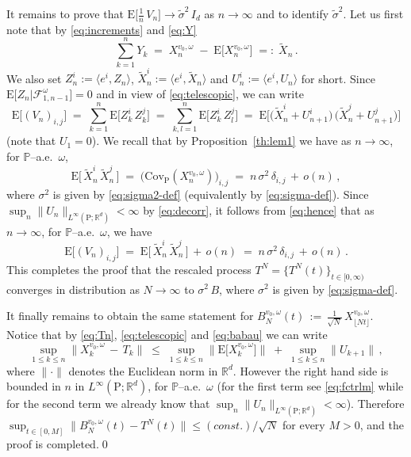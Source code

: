\documentclass[a4paper,reqno,11pt]{amsart}
\numberwithin{equation}{section}
\newcommand{\bbP}{{\ensuremath{\mathbb P}} }
\newcommand{\cF}{{\ensuremath{\mathcal F}} }
\newcommand{\gd}{\delta}
\newcommand{\gs}{\sigma}
\newcommand{\go}{\omega}
\renewcommand{\tilde}{\widetilde}          %
\newcommand{\R}{\mathbb{R}}
\def\bP{\ensuremath{\bs{\mathrm{P}}}}
\def\bE{\ensuremath{\bs{\mathrm{E}}}}
\def\bs{\boldsymbol}
\begin{document}
It remains to prove that $\bE \big[ \frac 1n \, V_n \big] \to \tilde\gs^2 \, I_d$
as $n\to\infty$ and to identify $\tilde\gs^2$.
Let us first note that by \eqref{eq:increments} and \eqref{eq:Y}
\begin{equation} \label{eq:babau}
	\sum_{k=1}^n Y_k \;=\; X_n^{v_0, \go} \;-\; \bE \big[ X_n^{v_0, \go} \big]
	\;=:\; \widetilde X_n
	\,.
\end{equation}
We also set $Z_n^i := \langle e^i, Z_n \rangle$,
$\widetilde X_n^i := \langle e^i, \widetilde X_n \rangle$
and $U_n^i := \langle e^i, U_n \rangle$ for short.
Since $\bE \big[ Z_n \big| \cF^\go_{1,n-1} \big] = 0$
and in view of \eqref{eq:telescopic}, we can write
\begin{equation} \label{eq:hence}
	\bE \big[ (V_n)_{i,j} \big] \;=\; \sum_{k=1}^n
	\bE \big[ Z_k^i \, Z_k^j \big] \;=\; \sum_{k,l=1}^n
	\bE \big[ Z_k^i \, Z_l^j \big] \;=\;
	\bE \big[ \big(\tilde X_n^i + U_{n+1}^i\big)\, \big(\tilde X_n^j + U_{n+1}^j \big) \big]
\end{equation}
(note that $U_1 = 0$). We recall that by Proposition~\ref{th:lem1} we have as $n \to \infty$,
for $\bbP$--a.e.~$\go$,
\begin{equation}
	\bE \big[\, \tilde X_n^i \, \tilde X_n^j \, \big] \;=\;
	\big( \text{Cov}_{\bP}( X_n^{v_0, \go}) \big)_{i,j} \;=\; n \, \gs^2 \, \gd_{i,j}
	\,+\, o(n) \,,
\end{equation}
where $\gs^2$ is given by \eqref{eq:sigma2-def} (equivalently by \eqref{eq:sigma-def}).
Since $\sup_n \|U_n\|_{L^\infty(\bP;\R^d)}<\infty$ by \eqref{eq:decorr},
it follows from \eqref{eq:hence} that as $n \to \infty$, for $\bbP$--a.e.~$\go$, we have
\begin{equation}
	\bE \big[ (V_n)_{i,j} \big] \;=\; \bE \big[\, \tilde X_n^i \, \tilde X_n^j \, \big]
	\,+\, o(n) \;=\; n \, \gs^2 \, \gd_{i,j} \,+\, o(n) \,.
\end{equation}
This completes the proof that the rescaled process $T^N = \{T^N(t)\}_{t \in [0,\infty)}$
converges in distribution as $N \to \infty$ to $\gs^2 \, B$, where
$\gs^2$ is given by \eqref{eq:sigma-def}.

It finally remains to obtain the same statement for
$B^{v_0, \go}_{N}(t) \,:=\, \frac{1}{\sqrt N} \, X^{v_0, \omega}_{ \lfloor Nt\rfloor}$.
Notice that by \eqref{eq:Tn}, \eqref{eq:telescopic} and \eqref{eq:babau} we can write
\begin{equation}
	\sup_{1 \le k \le n} \big\| X^{v_0, \omega}_k \,-\, T_k \big\| \;\le\;
	\sup_{1 \le k \le n} \big\| \bE \big[ X^{v_0, \omega}_k \big] \big\| \;+\;
	\sup_{1 \le k \le n} \big\| U_{k+1} \big\| \,,
\end{equation}
where $\|\cdot\|$ denotes the Euclidean norm in $\R^d$.
However the right hand side is bounded in $n$ in $L^\infty(\bP;\R^d)$,
for $\bbP$--a.e.~$\go$  (for the first term
see \eqref{eq:fctrlm} while for the second term
we already know that $\sup_n \|U_n\|_{L^\infty(\bP;\R^d)}<\infty$).
Therefore $\sup_{t \in [0,M]} \| B^{v_0, \go}_{N}(t) - T^N(t) \|
\le (const.)/\sqrt{N}$ for every $M > 0$, and the proof is completed.\qed
\end{document}
